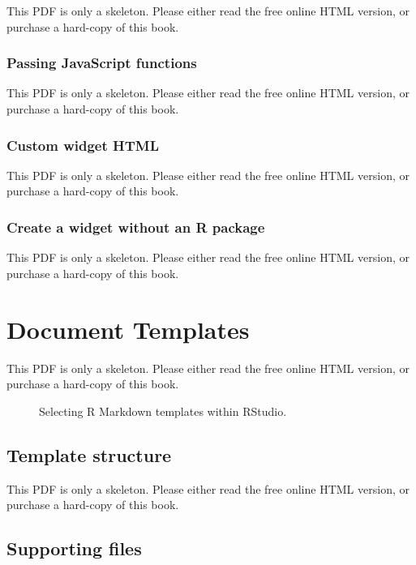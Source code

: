 \documentclass[
  11pt,
]{krantz}
\theoremstyle{definition}
\theoremstyle{definition}
\theoremstyle{definition}
\theoremstyle{definition}
\theoremstyle{remark}
\begin{document}
This PDF is only a skeleton. Please either read the free online HTML version, or purchase a hard-copy of this book.

\subsection{Passing JavaScript functions}\label{passing-javascript-functions}

This PDF is only a skeleton. Please either read the free online HTML version, or purchase a hard-copy of this book.

\subsection{Custom widget HTML}\label{custom-widget-html}

This PDF is only a skeleton. Please either read the free online HTML version, or purchase a hard-copy of this book.

\subsection{Create a widget without an R package}\label{create-a-widget-without-an-r-package}

This PDF is only a skeleton. Please either read the free online HTML version, or purchase a hard-copy of this book.

\chapter{Document Templates}\label{document-templates}

This PDF is only a skeleton. Please either read the free online HTML version, or purchase a hard-copy of this book.

\begin{figure}\caption{Selecting R Markdown templates within RStudio.}\end{figure}

\section{Template structure}\label{template-structure}

This PDF is only a skeleton. Please either read the free online HTML version, or purchase a hard-copy of this book.

\section{Supporting files}\label{template-support}
\end{document}
